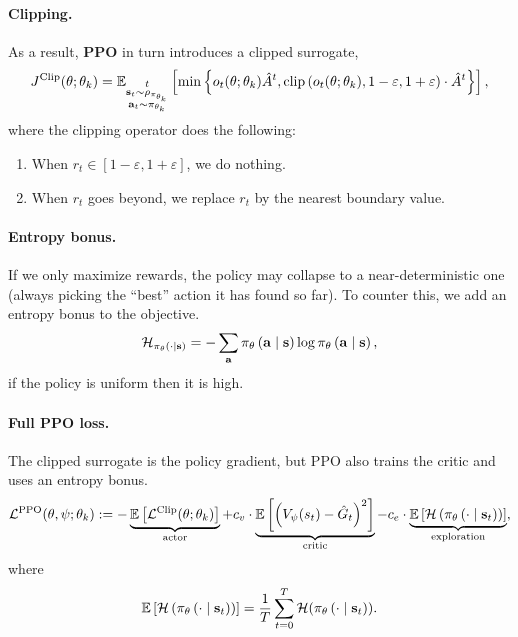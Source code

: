 \documentclass[11pt]{article}  %
\begin{document}
\paragraph{Clipping.} As a result, \textbf{PPO} in turn introduces a clipped surrogate,
\begin{align*}
  J^{\text{Clip}}(\theta; \theta_k) = \mathbb{E}_{\substack{t \\ \mathbf{s}_t \sim \rho_{\pi_{\theta_k}} \\ \mathbf{a}_t \sim \pi_{\theta_k}}}\left[\min\left\{ o_t(\theta; \theta_k) \hat{A}^t, \text{clip}\left( o_t(\theta; \theta_k), 1-\varepsilon, 1+\varepsilon \right)\cdot\hat{A}^t \right\}\right],
\end{align*}
where the clipping operator does the following:
\begin{enumerate}
  \item When $r_t \in [1 - \varepsilon, 1 + \varepsilon]$, we do nothing.
  \item When $r_t$ goes beyond, we replace $r_t$ by the nearest boundary value.
\end{enumerate}

\paragraph{Entropy bonus.}
If we only maximize rewards, the policy may collapse to a near-deterministic one (always picking the “best” action it has found so far).
To counter this, we add an entropy bonus to the objective.
\begin{align*}
  \mathcal{H}_{\pi_{\theta}\left( \cdot \mid \mathbf{s} \right)} = -\sum_{\mathbf{a}} \pi_{\theta}\left( \mathbf{a} \mid \mathbf{s} \right) \log \pi_{\theta}\left( \mathbf{a} \mid \mathbf{s} \right),
\end{align*}
if the policy is uniform then it is high.


\paragraph{Full PPO loss.}
The clipped surrogate is the policy gradient, but PPO also trains the critic and uses an entropy bonus.
\begin{align*}
  \mathcal{L}^{\text{PPO}}(\theta, \psi; \theta_k) := -\underbrace{\mathbb{E}\left[\mathcal{L}^{\text{Clip}}(\theta; \theta_k)\right]}_{\text{actor}} + c_v \cdot \underbrace{\mathbb{E}\left[\left( V_{\psi}(s_t) - \hat{G}_t \right)^2\right]}_{\text{critic}} - c_e \cdot \underbrace{\mathbb{E}\left[\mathcal{H}\left( \pi_{\theta}\left( \cdot \mid \mathbf{s}_t \right) \right)\right]}_{\text{exploration}},
\end{align*}
where 
\begin{align*}
  \mathbb{E}\left[\mathcal{H}\left( \pi_{\theta}\left( \cdot \mid \mathbf{s}_t \right) \right)\right] = \frac{1}{T}\sum_{t=0}^{T}\mathcal{H}(\pi_{\theta}\left( \cdot \mid \mathbf{s}_t \right)).
\end{align*}
\end{document}
